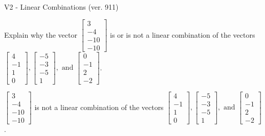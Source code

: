 \begin{exercise}
  \begin{exerciseTitle}V2 - Linear Combinations (ver. 911)\end{exerciseTitle}
  \begin{exerciseStatement}
    Explain why the vector \(\left[\begin{array}{c}
3 \\
-4 \\
-10 \\
-10
\end{array}\right]\)  is or is not a linear 
	combination of the vectors \(\left[\begin{array}{c}
4 \\
-1 \\
1 \\
0
\end{array}\right] , \left[\begin{array}{c}
-5 \\
-3 \\
-5 \\
1
\end{array}\right] , \text{ and } \left[\begin{array}{c}
0 \\
-1 \\
2 \\
-2
\end{array}\right]\).
	


  \end{exerciseStatement}
  \begin{exerciseAnswer}
   \(\left[\begin{array}{c}
3 \\
-4 \\
-10 \\
-10
\end{array}\right]\) 
  	 is not  
	a linear combination of the vectors \(\left[\begin{array}{c}
4 \\
-1 \\
1 \\
0
\end{array}\right] , \left[\begin{array}{c}
-5 \\
-3 \\
-5 \\
1
\end{array}\right] , \text{ and } \left[\begin{array}{c}
0 \\
-1 \\
2 \\
-2
\end{array}\right]\).

	
  


  \end{exerciseAnswer}
\end{exercise}